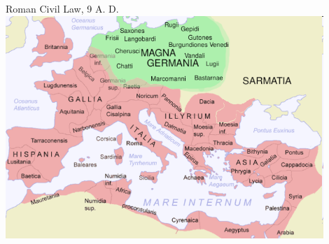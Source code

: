 \begin{frame}{Roman Civil Law, 9 A. D.}
    \centering
    \includegraphics[width=0.90\textwidth]{img/europe-map.png} \\
\end{frame}

